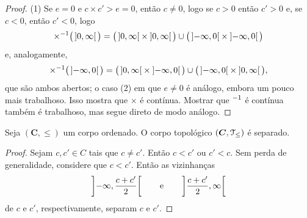 \begin{proof}
(1) Se $e=0$ e $c \times c' > e=0$, então $c \neq 0$, logo se $c > 0$ então $c'>0$ e, se $c < 0$, então $c' < 0$, logo
	\begin{equation*}
	\times^{-1} \big( \left]{0},{\infty}\right[ \big) = \big( \left]{0},{\infty}\right[ \times \left]{0},{\infty}\right[ \big) \cup \big( \left]{-\infty},{0}\right[ \times \left]{-\infty},{0}\right[ \big)
	\end{equation*}
e, analogamente,
	\begin{equation*}
	\times^{-1} \big( \left]{-\infty},{0}\right[ \big) = \big( \left]{0},{\infty}\right[ \times \left]{-\infty},{0}\right[ \big) \cup \big( \left]{-\infty},{0}\right[ \times \left]{0},{\infty}\right[ \big),
	\end{equation*}
que são ambos abertos;
%
%
%
%
%
o caso (2) em que $e \neq 0$ é análogo, embora um pouco mais trabalhoso. Isso mostra que $\times$ é contínua. Mostrar que $^{-1}$ é contínua também é trabalhoso, mas segue direto de modo análogo.
\end{proof}







\begin{proposition}
Seja $(\bm C,\leq)$ um corpo ordenado. O corpo topológico $(\bm C,\mathcal{T}_\leq)$ é separado.
\end{proposition}
\begin{proof}
Sejam $c,c' \in C$ tais que $c \neq c'$. Então $c < c'$ ou $c' < c$. Sem perda de generalidade, considere que $c < c'$. Então as vizinhanças
	\begin{equation*}
	\left]{-\infty},{\frac{c+c'}{2}}\right[ \qquad\text{e}\qquad \left]{\frac{c+c'}{2}},{\infty}\right[
	\end{equation*}
de $c$ e $c'$, respectivamente, separam $c$ e $c'$.
\end{proof}

